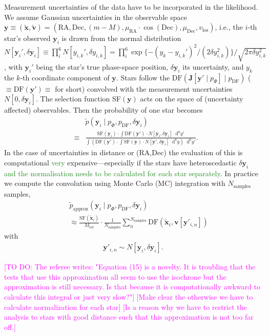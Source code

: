 \documentclass[iop,revtex4]{emulateapj}
\newcommand{\vect}[1]{\boldsymbol{#1}}
\newcommand*\Diff[1]{\mathop{}\!\mathrm{d^#1}}
\newcommand{\NEW}[1]{\textcolor{ForestGreen}{#1}}
\newcommand{\Wilma}[1]{\textcolor{Magenta}{#1}}
\begin{document}
Measurement uncertainties of the data have to be incorporated in the likelihood. We assume Gaussian uncertainties in the observable space $\vect{y} \equiv (\tilde{\vect{x}},\tilde{\vect{v}})=(\text{RA},\text{Dec},(m-M),\mu_\text{RA} \cdot \cos (\text{Dec}),\mu_\text{Dec},v_\text{los})$, i.e., the $i$-th star's observed $\vect{y}_i$ is drawn from the normal distribution $N[{\vect{y}_i}',\delta \vect{y}_i] \equiv \prod_i^6 N[{y_{i,k}}',\delta y_{i,k}] =  \prod_i^6 \exp \{-(y_{k}-{y_{i,k}}')^2/ (2 \delta y_{i,k}^2) \} / \sqrt{2 \pi \delta y_{i,k}^2}$, with ${\vect{y}_i}'$ being the star's true phase-space position, $\delta \vect{y}_i$ its uncertainty, and $y_k$ the $k$-th coordinate component of $\vect{y}$. Stars follow the $\text{DF}(\vect{J}[\vect{y}' \mid p_\Phi] \mid p_\text{DF})$ ($\equiv \text{DF}(\vect{y}') \equiv$  for short) convolved with the measurement uncertainties $N[0,\delta \vect{y}_i]$. The selection function SF$(\vect{y})$ acts on the space of (uncertainty affected) observables. Then the probability of one star becomes
\begin{eqnarray}
&&\tilde{p}(\vect{y}_i \mid p_\Phi,p_\text{DF},\delta \vect{y}_i)\nonumber\\
& \equiv& \frac{\text{SF}(\vect{y}_i) \cdot \int \text{DF}(\vect{y}') \cdot N[\vect{y}_i,\delta \vect{y}_i] \Diff{6} y'}{\int \left(  \text{DF}(\vect{y}')  \cdot  \int \text{SF}(\vect{y})  \cdot N[\vect{y}',\delta \vect{y}_i] \Diff{6} y \right) \Diff{6}y'}.
\end{eqnarray}
In the case of uncertainties in distance or (RA,Dec) the evaluation of this is computational \NEW{very} expensive---especially if the stars have heteroscedastic $\delta \vect{y}_i$\NEW{ and the normalisation needs to be calculated for each star separately}. In practice we compute the convolution using Monte Carlo (MC) integration with $N_\text{samples}$ samples,
\begin{eqnarray}
&&\tilde{p}_\text{approx}(\vect{y}_i \mid p_\Phi,p_\text{DF},\delta \vect{y}_i) \nonumber\\
&&\approx \frac{ \text{SF}(\tilde{\vect{x}}_i)}{M_\text{tot}} \cdot \frac{1}{N_\text{samples}} \sum_n^{N_\text{samples}}  \text{DF}(\tilde{\vect{x}}_i,\vect{v}[\vect{y}'_{i,n}]) \label{eq:errorconv}
\end{eqnarray}
with
\begin{eqnarray}
\vect{y}'_{i,n} \sim N[\vect{y}_i,\delta \vect{y}_i].\nonumber
\end{eqnarray}

\Wilma{[TO DO: The referee writes: "Equation (15) is a novelty. It is troubling that the tests that use this approximation all seem to use the isochrone but the approximation is still necessary. Is that because it is computationally awkward to calculate this integral or just very slow?"] [Make clear the otherwise we have to calculate normalization for each star] [Is a reason why we have to restrict the analysis to stars with good distance such that this approximation is not too far off.]}
\end{document}
